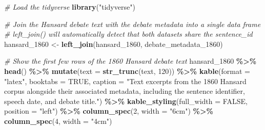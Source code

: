 \documentclass[
]{article}
\newenvironment{Shaded}{\begin{snugshade}}{\end{snugshade}}
\newcommand{\AttributeTok}[1]{\textcolor[rgb]{0.13,0.29,0.53}{#1}}
\newcommand{\CommentTok}[1]{\textcolor[rgb]{0.56,0.35,0.01}{\textit{#1}}}
\newcommand{\ConstantTok}[1]{\textcolor[rgb]{0.56,0.35,0.01}{#1}}
\newcommand{\DecValTok}[1]{\textcolor[rgb]{0.00,0.00,0.81}{#1}}
\newcommand{\FunctionTok}[1]{\textcolor[rgb]{0.13,0.29,0.53}{\textbf{#1}}}
\newcommand{\NormalTok}[1]{#1}
\newcommand{\OtherTok}[1]{\textcolor[rgb]{0.56,0.35,0.01}{#1}}
\newcommand{\SpecialCharTok}[1]{\textcolor[rgb]{0.81,0.36,0.00}{\textbf{#1}}}
\newcommand{\StringTok}[1]{\textcolor[rgb]{0.31,0.60,0.02}{#1}}
\begin{document}
\begin{Shaded}
\begin{Highlighting}[]
\CommentTok{\# Load the tidyverse}
\FunctionTok{library}\NormalTok{(}\StringTok{"tidyverse"}\NormalTok{)}

\CommentTok{\# Join the Hansard debate text with the debate metadata into a single data frame}
\CommentTok{\# left\_join() will automatically detect that both datasets share the sentence\_id }
\NormalTok{hansard\_1860 }\OtherTok{\textless{}{-}} \FunctionTok{left\_join}\NormalTok{(hansard\_1860, debate\_metadata\_1860)}

\CommentTok{\# Show the first few rows of the 1860 Hansard debate text}
\NormalTok{hansard\_1860 }\SpecialCharTok{\%\textgreater{}\%}
  \FunctionTok{head}\NormalTok{() }\SpecialCharTok{\%\textgreater{}\%}
  \FunctionTok{mutate}\NormalTok{(}\AttributeTok{text =} \FunctionTok{str\_trunc}\NormalTok{(text, }\DecValTok{120}\NormalTok{)) }\SpecialCharTok{\%\textgreater{}\%}  
  \FunctionTok{kable}\NormalTok{(}\AttributeTok{format =} \StringTok{"latex"}\NormalTok{, }
        \AttributeTok{booktabs =} \ConstantTok{TRUE}\NormalTok{, }
        \AttributeTok{caption =} \StringTok{"Text excerpts from the 1860 Hansard corpus alongside their associated }
\StringTok{                  metadata, including the sentence identifier, speech date, and }
\StringTok{                  debate title."}\NormalTok{) }\SpecialCharTok{\%\textgreater{}\%}
  \FunctionTok{kable\_styling}\NormalTok{(}\AttributeTok{full\_width =} \ConstantTok{FALSE}\NormalTok{, }\AttributeTok{position =} \StringTok{"left"}\NormalTok{) }\SpecialCharTok{\%\textgreater{}\%}
  \FunctionTok{column\_spec}\NormalTok{(}\DecValTok{2}\NormalTok{, }\AttributeTok{width =} \StringTok{"6cm"}\NormalTok{) }\SpecialCharTok{\%\textgreater{}\%}
  \FunctionTok{column\_spec}\NormalTok{(}\DecValTok{4}\NormalTok{, }\AttributeTok{width =} \StringTok{"4cm"}\NormalTok{)}
\end{Highlighting}
\end{Shaded}
\end{document}
